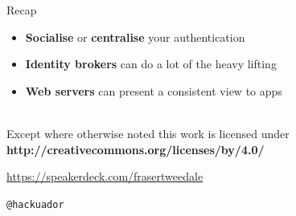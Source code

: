 \documentclass[ignorenonframetext,aspectratio=169]{beamer}
\providecommand{\tightlist}{%
  \setlength{\itemsep}{0pt}\setlength{\parskip}{0pt}}
\begin{document}
\begin{frame}{Recap}

\begin{itemize}
\tightlist
\item {\bf Socialise} or {\bf centralise} your authentication
\item \textbf{Identity brokers} can do a lot of the heavy lifting
\item \textbf{Web servers} can present a consistent view to apps
\end{itemize}

\end{frame}

\begin{frame}[plain]




    \setlength{\parskip}{.5em}

    { \centering

    
    \\
    { \scriptsize
    Except where otherwise noted this work is licensed under
    }\\
    { \footnotesize
    \textbf{http://creativecommons.org/licenses/by/4.0/}
    }

    \bigskip
    \Large

    \url{https://speakerdeck.com/frasertweedale}

    \texttt{@hackuador}

    }


\end{frame}
\end{document}
